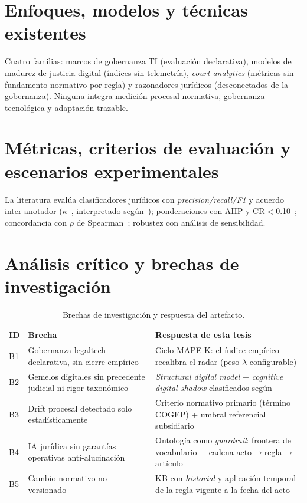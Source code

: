 \documentclass[a4paper,openany,12pt]{book}
\begin{document}
\section{Enfoques, modelos y técnicas existentes}
Cuatro familias: marcos de gobernanza TI (evaluación declarativa), modelos de madurez de justicia digital (índices sin telemetría), \textit{court analytics} (métricas sin fundamento normativo por regla) y razonadores jurídicos (desconectados de la gobernanza). Ninguna integra medición procesal normativa, gobernanza tecnológica y adaptación trazable.
\section{Métricas, criterios de evaluación y escenarios experimentales}
La literatura evalúa clasificadores jurídicos con \textit{precision/recall/F1} y acuerdo inter-anotador ($\kappa$~\cite{cohen1960}, interpretado según~\cite{landis1977}); ponderaciones con AHP y CR$<$0.10~\cite{saaty1990}; concordancia con $\rho$ de Spearman~\cite{spearman1904}; robustez con análisis de sensibilidad.
\section{Análisis crítico y brechas de investigación}
\begin{table}[H]\centering\footnotesize
\caption{Brechas de investigación y respuesta del artefacto.}\label{tab:brechas}
\begin{tabular}{p{0.8cm}p{6.2cm}p{6.2cm}}\toprule
\textbf{ID} & \textbf{Brecha} & \textbf{Respuesta de esta tesis} \\ \midrule
B1 & Gobernanza legaltech declarativa, sin cierre empírico & Ciclo MAPE-K: el índice empírico recalibra el radar (peso $\lambda$ configurable) \\
B2 & Gemelos digitales sin precedente judicial ni rigor taxonómico & \textit{Structural digital model} + \textit{cognitive digital shadow} clasificados según~\cite{kritzinger2018,zheng2022} \\
B3 & Drift procesal detectado solo estadísticamente & Criterio normativo primario (término COGEP) + umbral referencial subsidiario \\
B4 & IA jurídica sin garantías operativas anti-alucinación & Ontología como \textit{guardrail}: frontera de vocabulario + cadena acto$\to$regla$\to$artículo \\
B5 & Cambio normativo no versionado & KB con \textit{historial} y aplicación temporal de la regla vigente a la fecha del acto \\ \bottomrule
\end{tabular}\end{table}
\end{document}
